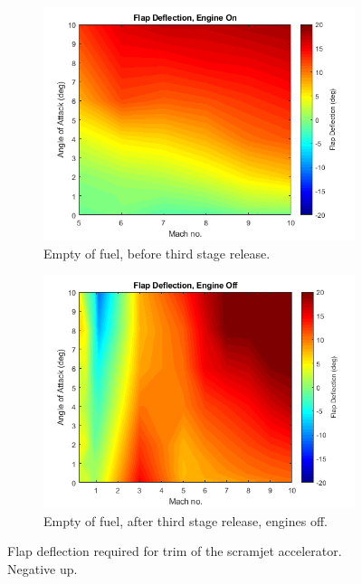 \begin{figure}[ht]
\begin{subfigure}{.5\textwidth}
			\end{subfigure}
			\begin{subfigure}{.5\textwidth}
				\centering
				\includegraphics[width=0.99\linewidth]{figures/3_vehicle_design/FlapEngineCG3}
				\caption{Empty of fuel, before third stage release.}
				
			\end{subfigure}
			\begin{subfigure}{.5\textwidth}
				\centering
				\includegraphics[width=0.99\linewidth]{figures/3_vehicle_design/FlapNoEngineCG4}
				\caption{Empty of fuel, after third stage release, engines off.}
				
			\end{subfigure}
			\caption{Flap deflection required for trim of the scramjet accelerator. Negative up.} %
			\label{fig:FlapDeflection}
		\end{figure}
		
